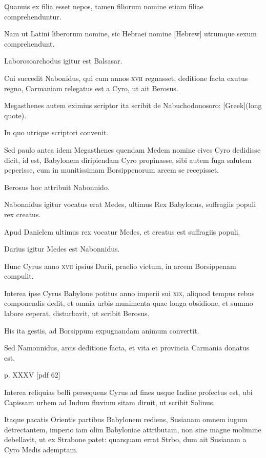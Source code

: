 \begin{parnumbers}
Quanuis ex filia esset nepos, tamen filiorum nomine etiam filiae
 comprehenduntur.

Nam ut Latini liberorum nomine, sic Hebraei nomine
\texthebrew{[Hebrew]} utrumque sexum comprehendunt.

Laborosoarchodus igitur
est Balsasar.

Cui succedit Nabonidus, qui cum annos \textsc{xvii} regnasset,
deditione facta exutus regno, Carmaniam relegatus est a Cyro,
ut ait Berosus.

Megasthenes autem eximius scriptor ita scribit de
Nabuchodonosoro: \textgreek{[Greek](long quote)}.

In
quo utrique scriptori convenit.

Sed paulo antea idem Megasthenes
quendam Medem nomine cives Cyro dedidisse dicit, id est, Babylonem
diripiendam Cyro propinasse, sibi autem fuga salutem peperisse,
cum in munitissimam Borsippenorum arcem se recepisset.

Berosus hoc attribuit Nabonnido.

Nabonnidus igitur vocatus erat
Medes, ultimus Rex Babylonus, suffragiis populi rex creatus.

Apud
Danielem ultimus rex vocatur Medes, et creatus est suffragiis populi.

Darius igitur Medes est Nabonnidus.

Hunc Cyrus anno \textsc{xvii}
ipsius Darii, praelio victum, in arcem Borsippenam compulit.

Interea ipse Cyrus Babylone potitus anno imperii sui \textsc{xix}, aliquod
tempus rebus componendis dedit, et omnia urbis munimenta
quae longa obsidione, et summo labore ceperat, disturbavit, ut
scribit Berosus.

His ita gestis, ad Borsippum expugnandam animum
convertit.

Sed Namonnidus, arcis deditione facta, et vita
et provincia Carmania donatus est.

\clearpage
p. XXXV [pdf 62]

Interea reliquias belli persequens
Cyrus ad fines usque Indiae profectus est, ubi Capissam urbem
ad Indum fluvium sitam diruit, ut scribit Solinus.

Itaque pacatis Orientis partibus Babylonem rediens, Susianam omnem iugum
detrectantem, imperio iam olim Babyloniae attributam, non
sine magne molimine debellavit, ut ex Strabone patet: quanquam
errat Strbo, dum ait Susianam a Cyro Medis ademptam.


\end{parnumbers}
